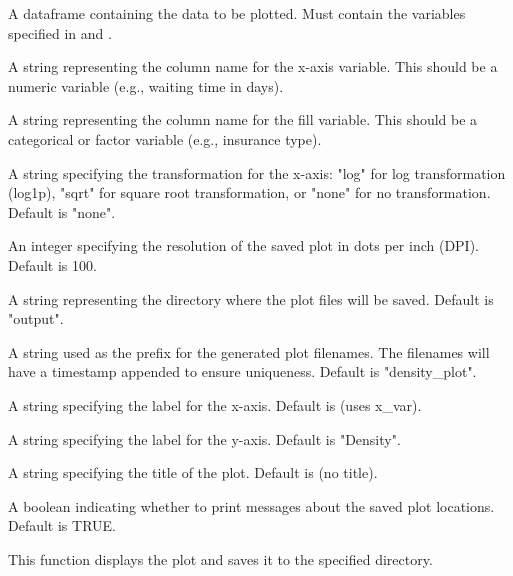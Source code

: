 \documentclass[a4paper]{book}
\begin{document}
\begin{Arguments}
\begin{ldescription}
\item[\code{data}] A dataframe containing the data to be plotted. Must contain the variables specified in  and .

\item[\code{x\_var}] A string representing the column name for the x-axis variable. This should be a numeric variable (e.g., waiting time in days).

\item[\code{fill\_var}] A string representing the column name for the fill variable. This should be a categorical or factor variable (e.g., insurance type).

\item[\code{x\_transform}] A string specifying the transformation for the x-axis: "log" for log transformation (log1p), "sqrt" for square root transformation, or "none" for no transformation. Default is "none".

\item[\code{dpi}] An integer specifying the resolution of the saved plot in dots per inch (DPI). Default is 100.

\item[\code{output\_dir}] A string representing the directory where the plot files will be saved. Default is "output".

\item[\code{file\_prefix}] A string used as the prefix for the generated plot filenames. The filenames will have a timestamp appended to ensure uniqueness. Default is "density\_plot".

\item[\code{x\_label}] A string specifying the label for the x-axis. Default is  (uses x\_var).

\item[\code{y\_label}] A string specifying the label for the y-axis. Default is "Density".

\item[\code{plot\_title}] A string specifying the title of the plot. Default is  (no title).

\item[\code{verbose}] A boolean indicating whether to print messages about the saved plot locations. Default is TRUE.
\end{ldescription}
\end{Arguments}
%
\begin{Value}
This function displays the plot and saves it to the specified directory.
\end{Value}
\end{document}
